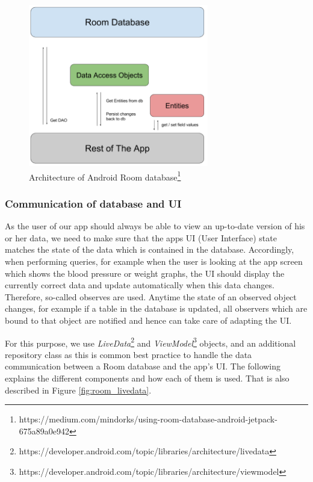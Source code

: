 \begin{figure}[htb]
	\centering
	\includegraphics[width = 0.7\textwidth]{figures/room_architecture.png}
	\caption[Room architecture]{Architecture of Android Room database\footnote{https://medium.com/mindorks/using-room-database-android-jetpack-675a89a0e942}}
	\label{fig:room_architecture}
\end{figure}



\subsubsection{Communication of database and UI}

As the user of our app should always be able to view an up-to-date version of his or her data, we need to make sure that the apps UI (User Interface) state matches the state of the data which is contained in the database. Accordingly, when performing queries, for example when the user is looking at the app screen which shows the blood pressure or weight graphs, the UI should display the currently correct data and update automatically when this data changes. Therefore, so-called observes are used. Anytime the state of an observed object changes, for example if a table in the database is updated, all observers which are bound to that object are notified and hence can take care of adapting the UI. 

For this purpose, we use \textit{LiveData}\footnote{https://developer.android.com/topic/libraries/architecture/livedata} and \textit{ViewModel}\footnote{https://developer.android.com/topic/libraries/architecture/viewmodel} objects, and an additional repository class as this is common best practice to handle the data communication between a Room database and the app's UI. The following explains the different components and how each of them is used. That is also described in Figure \ref{fig:room_livedata}. 


